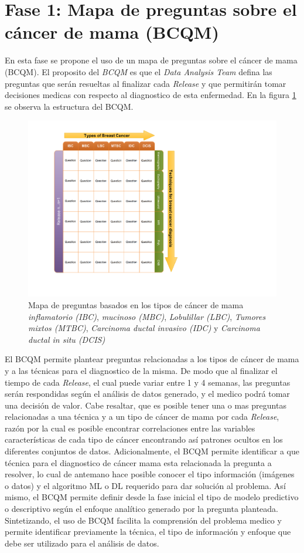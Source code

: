 \newpage
\section{Fase 1: Mapa de preguntas sobre el cáncer de mama (BCQM)} 
En esta fase se propone el uso de un mapa de preguntas sobre el cáncer de mama (BCQM). El proposito del \textit{BCQM} es que el \textit{Data Analysis Team} defina las preguntas que serán resueltas al finalizar cada \textit{Release} y que permitirán tomar decisiones medicas con respecto al diagnostico de esta enfermedad. En la figura \ref{BCQM} se observa la estructura del BCQM.

\begin{figure}[!htb]
	\centering
	\includegraphics[width=0.6
	\linewidth]{IMAGENES/BCQM}
	\caption{Mapa de preguntas basados en los tipos de cáncer de mama \textit{inflamatorio (IBC)}, \textit{mucinoso (MBC)}, \textit{Lobulillar (LBC)}, \textit{Tumores mixtos (MTBC)}, \textit{Carcinoma ductal invasivo (IDC)} y \textit{Carcinoma ductal in situ (DCIS)}}
	\label{BCQM}
\end{figure}

El BCQM permite plantear preguntas relacionadas a los tipos de cáncer de mama y a las técnicas para el diagnostico de la misma. De modo que al finalizar el tiempo de cada \textit{Release}, el cual puede variar entre 1 y 4 semanas, las preguntas serán respondidas según el análisis de datos generado, y el medico podrá tomar una decisión de valor. Cabe resaltar, que es posible tener una o mas preguntas relacionadas a una técnica y a un tipo de cáncer de mama por cada \textit{Release}, razón por la cual es posible encontrar correlaciones entre las variables características de cada tipo de cáncer encontrando así patrones ocultos en los diferentes conjuntos de datos. Adicionalmente, el BCQM permite identificar a que técnica para el diagnostico de cáncer mama esta relacionada la pregunta a resolver, lo cual de antemano hace posible conocer el tipo información (imágenes o datos) y el algoritmo  ML o DL requerido para dar solución al problema. Así mismo, el BCQM permite definir desde la fase inicial el tipo de modelo predictivo o descriptivo según el enfoque analítico generado por la pregunta planteada. Sintetizando, el uso de BCQM facilita la comprensión del problema medico y permite identificar previamente la técnica, el tipo de información y enfoque que debe ser utilizado para el análisis de datos.  


